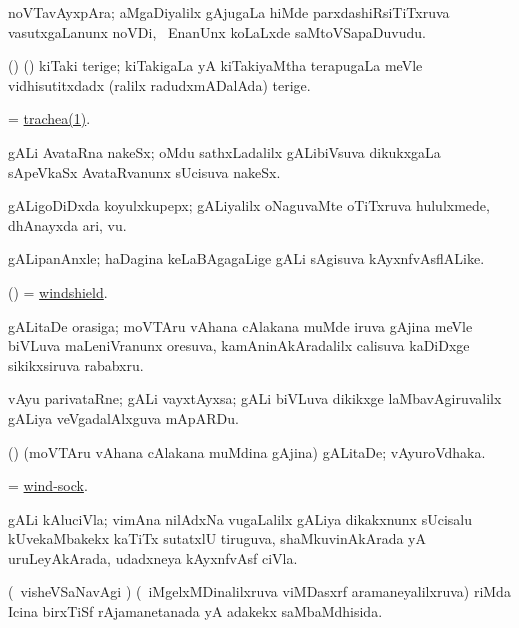 \bentry
{}
\gl{\nA}
\bmng
noVTavAyxpAra; aMgaDiyalilx gAjugaLa hiMde parxdashiRsiTiTxruva vasutxgaLanunx noVDi, \sA\ EnanUnx koLaLxde saMtoVSapaDuvudu. 
\emng
\eentry

\bentry
{}
\pron{}
\gl{\nA}
\bmng
(\birx) (\ca) kiTaki terige; kiTakigaLa yA kiTakiyaMtha terapugaLa meVle vidhisutitxdadx (ralilx radudxmADalAda) terige. 
\emng
\eentry

\bentry
{}
\gl{\nA}
\bmng
= \hyperref{kandict_t.pdf}{T}{trachea(1)}{trachea(1)}. 
\emng
\eentry

\bentry
{}
\gl{\nA}
\bmng
gALi AvataRna nakeSx; oMdu sathxLadalilx gALibiVsuva dikukxgaLa sApeVkaSx AvataRvanunx sUcisuva nakeSx. 
\emng
\eentry

\bentry
{}
\gl{\nA}
\bmng
gALigoDiDxda koyulxkupepx; gALiyalilx oNaguvaMte oTiTxruva hululxmede, dhAnayxda ari, \mo vu. 
\emng
\eentry

\bentry
{}
\gl{\nA}
\bmng
gALipanAnxle; haDagina keLaBAgagaLige gALi sAgisuva kAyxnfvAsflALike. 
\emng
\eentry

\bentry
{}
\gl{\nA}
\bmng
(\birx) = \hyperlink{windshield}{windshield}. 
\emng

\noindent
\gl{\pagu}
\bmng
{} gALitaDe orasiga; moVTAru vAhana cAlakana muMde iruva gAjina meVle biVLuva maLeniVranunx oresuva, kamAninAkAradalilx calisuva kaDiDxge sikikxsiruva rababxru. 
\emng
\eentry

\bentry
{}
\gl{\nA}
\bmng
vAyu parivataRne; gALi vayxtAyxsa; gALi biVLuva dikikxge laMbavAgiruvalilx gALiya veVgadalAlxguva mApARDu. 
\emng
\eentry

\bentry
{}
\gl{\nA}
\bmng
(\ame) (moVTAru vAhana cAlakana muMdina gAjina) gALitaDe; vAyuroVdhaka. 
\emng
\eentry

\bentry
{}
\gl{\nA}
\bmng
= \hyperlink{wind-sock}{wind-sock}. 
\emng
\eentry

\bentry
{}
\gl{\nA}
\bmng
gALi kAluciVla; vimAna nilAdxNa \mo vugaLalilx gALiya dikakxnunx sUcisalu kUvekaMbakekx kaTiTx sutatxlU tiruguva, shaMkuvinAkArada yA uruLeyAkArada, udadxneya kAyxnfvAsf ciVla. 
\emng
\eentry

\bentry
{}
\gl{\nA} 
\bmng
(\sA\ visheVSaNavAgi \parx) (\da\ iMgelxMDinalilxruva viMDasxrf aramaneyalilxruva) riMda Icina birxTiSf rAjamanetanada yA adakekx saMbaMdhisida. 
\emng

